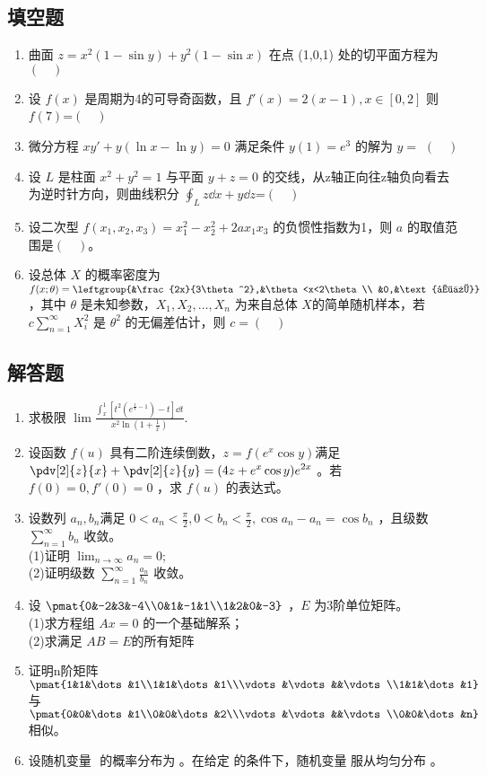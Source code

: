 \subsection{填空题}
\begin{enumerate}
\item 曲面 $z=x^2(1-\sin y)+y^2(1-\sin x)$  在点 (1,0,1) 处的切平面方程为$(\quad)$
\item 设 $f(x)$ 是周期为4的可导奇函数，且 $f'(x)=2(x-1),x \in [0,2]$  则 $f(7)$=$(\quad)$
\item 微分方程 $xy'+y(\ln x-\ln y)=0$ 满足条件 $y(1)=e^3$ 的解为 $y=$ $(\quad)$
\item 设 $L$ 是柱面 $x^2+y^2=1$ 与平面 $y+z=0$ 的交线，从z轴正向往z轴负向看去为逆时针方向，则曲线积分 $\displaystyle \oint_L z\dd{x}+y\dd{z}$=$(\quad)$
\item 设二次型 $f(x_1,x_2,x_3)=x_1^2-x_2^2+2ax_1x_3$  的负惯性指数为1，则 $a$ 的取值范围是$(\quad)$。
\item 设总体 $X$ 的概率密度为$f(x;\theta)=\leftgroup{&\frac{2x}{3\theta^2},&\theta<x<2\theta \\ &0,&\text{其他}} $ ，其中 $\theta$  是未知参数，$X_1,X_2,\dots,X_n$  为来自总体 $X$的简单随机样本，若  $\displaystyle c\sum_{n=1}^\infty X_i^2$ 是 $\theta^2$ 的无偏差估计，则 $c=(\quad)$
\end{enumerate}
\subsection{解答题}
\begin{enumerate}
\item 求极限 $\displaystyle \lim \frac{\int_{x}^{1} [t^2(e^{\frac{1}{t}-1})-t]\dd{t}}{x^2\ln(1+\frac{1}{x})}$.
\item 设函数 $f(u)$ 具有二阶连续倒数，$z=f(e^x\cos y)$满足 $\displaystyle \pdv[2]{z}{x}+\pdv[2]{z}{y}=(4z+e^x\cos y)e^{2x}$  。若 $f(0)=0,f'(0)=0$ ，求 $f(u)$ 的表达式。
\item 设数列 ${a_n},{b_n}$满足 $\displaystyle 0<a_n<\frac{\pi}{2},0<b_n<\frac{\pi}{2},\cos a_n-a_n=\cos b_n$ ，且级数 $\displaystyle \sum_{n=1}^\infty b_n$  收敛。\\
(1)证明 $\lim_{n\to\infty} a_n=0;$\\
(2)证明级数 $\displaystyle \sum_{n=1}^\infty \frac{a_n}{b_n}$  收敛。
\item 设 $\pmat{0&-2&3&-4\\0&1&-1&1\\1&2&0&-3}$ ，$ E$  为3阶单位矩阵。\\
(1)求方程组 $Ax=0$ 的一个基础解系；\\
(2)求满足 $AB=E$的所有矩阵 
\item 证明n阶矩阵 $\pmat{1&1&\dots&1\\1&1&\dots&1\\\vdots&\vdots&&\vdots\\1&1&\dots&1}$ 与 $\pmat{0&0&\dots&1\\0&0&\dots&2\\\vdots&\vdots&&\vdots\\0&0&\dots&n}$ 相似。
\item 设随机变量 $$ 的概率分布为 。在给定  的条件下，随机变量  服从均匀分布  。
\end{enumerate}
